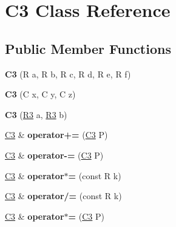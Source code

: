 \hypertarget{class_c3}{}\section{C3 Class Reference}
\label{class_c3}
\subsection*{Public Member Functions}
\begin{DoxyCompactItemize}
\item 
{\bfseries C3} (R a, R b, R c, R d, R e, R f)\hypertarget{class_c3_a1a285e46aae23814b32c18cd1c0c2556}{}\label{class_c3_a1a285e46aae23814b32c18cd1c0c2556}

\item 
{\bfseries C3} (C x, C y, C z)\hypertarget{class_c3_a0cf047bf667d4d9ae320812c5c245b1f}{}\label{class_c3_a0cf047bf667d4d9ae320812c5c245b1f}

\item 
{\bfseries C3} (\hyperlink{class_r3}{R3} a, \hyperlink{class_r3}{R3} b)\hypertarget{class_c3_adb392a31889cda0cd847b2d806e7b8a8}{}\label{class_c3_adb392a31889cda0cd847b2d806e7b8a8}

\item 
\hyperlink{class_c3}{C3} \& {\bfseries operator+=} (\hyperlink{class_c3}{C3} P)\hypertarget{class_c3_a40d1d12b414806000ca328cc8e14284f}{}\label{class_c3_a40d1d12b414806000ca328cc8e14284f}

\item 
\hyperlink{class_c3}{C3} \& {\bfseries operator-\/=} (\hyperlink{class_c3}{C3} P)\hypertarget{class_c3_ac3de33292705dee9952140856f1ad92a}{}\label{class_c3_ac3de33292705dee9952140856f1ad92a}

\item 
\hyperlink{class_c3}{C3} \& {\bfseries operator$\ast$=} (const R k)\hypertarget{class_c3_a6fe35bf1e982abd5988a30f83eaccad2}{}\label{class_c3_a6fe35bf1e982abd5988a30f83eaccad2}

\item 
\hyperlink{class_c3}{C3} \& {\bfseries operator/=} (const R k)\hypertarget{class_c3_aeb1d2e2b851faac2745880f70cc71010}{}\label{class_c3_aeb1d2e2b851faac2745880f70cc71010}

\item 
\hyperlink{class_c3}{C3} \& {\bfseries operator$\ast$=} (\hyperlink{class_c3}{C3} P)\hypertarget{class_c3_a413e83605fea1a2ee0f213f5917a9cad}{}\label{class_c3_a413e83605fea1a2ee0f213f5917a9cad}


\end{DoxyCompactItemize}
